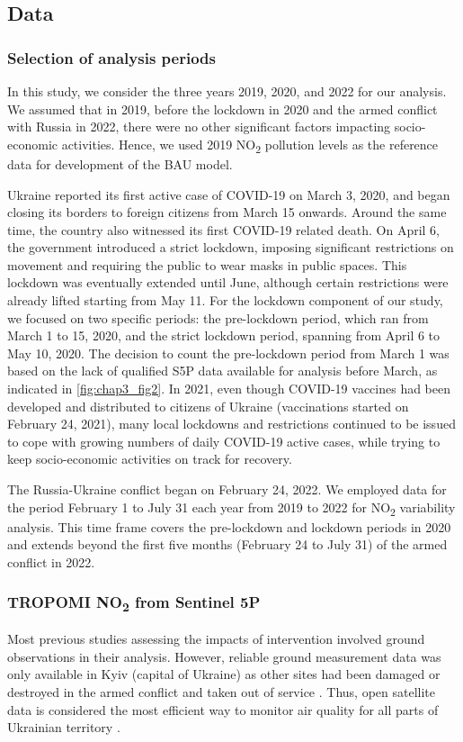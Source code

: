 \subsection{Data} \label{chap3_data}
\subsubsection*{Selection of analysis periods}
In this study, we consider the three years 2019, 2020, and 2022 for our analysis. We assumed that in 2019, before the lockdown in 2020 and the armed conflict with Russia in 2022, there were no other significant factors impacting socio-economic activities. Hence, we used 2019 NO\textsubscript{2} pollution levels as the reference data for development of the BAU model. \par
Ukraine reported its first active case of COVID-19 on March 3, 2020, and began closing its borders to foreign citizens from March 15 onwards. Around the same time, the country also witnessed its first COVID-19 related death. On April 6, the government introduced a strict lockdown, imposing significant restrictions on movement and requiring the public to wear masks in public spaces. This lockdown was eventually extended until June, although certain restrictions were already lifted starting from May 11. For the lockdown component of our study, we focused on two specific periods: the pre-lockdown period, which ran from March 1 to 15, 2020, and the strict lockdown period, spanning from April 6 to May 10, 2020. The decision to count the pre-lockdown period from March 1 was based on the lack of qualified S5P data available for analysis before March, as indicated in \ref{fig:chap3_fig2}. In 2021, even though COVID-19 vaccines had been developed and distributed to citizens of Ukraine (vaccinations started on February 24, 2021), many local lockdowns and restrictions continued to be issued to cope with growing numbers of daily COVID-19 active cases, while trying to keep socio-economic activities on track for recovery. \par
The Russia-Ukraine conflict began on February 24, 2022. We employed data for the period February 1 to July 31 each year from 2019 to 2022 for NO\textsubscript{2} variability analysis. This time frame covers the pre-lockdown and lockdown periods in 2020 and extends beyond the first five months (February 24 to July 31) of the armed conflict in 2022.\par
\subsubsection*{TROPOMI NO\textsubscript{2} from Sentinel 5P}
Most previous studies assessing the impacts of intervention involved ground observations in their analysis. However, reliable ground measurement data was only available in Kyiv (capital of Ukraine) as other sites had been damaged or destroyed in the armed conflict and taken out of service \citep{savenets2021air}. Thus, open satellite data is considered the most efficient way to monitor air quality for all parts of Ukrainian territory \citep{shelestov2021air}. \par


